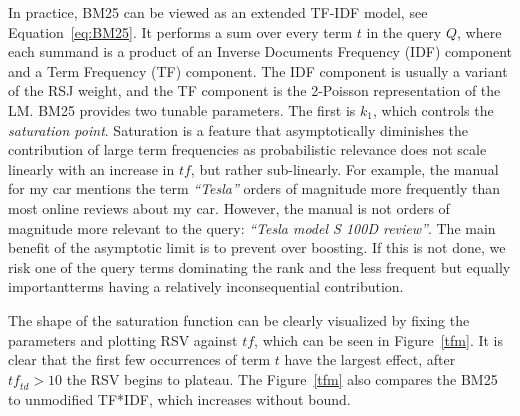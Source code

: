 In practice, BM25 can be viewed as an extended TF-IDF model, see Equation~\ref{eq:BM25}. It performs a sum over every term $t$ in the query $Q$, where each summand is a product of an Inverse Documents Frequency (IDF) component and a Term Frequency (TF) component. 
The IDF component is usually a variant of the RSJ weight, and the TF component is the 2-Poisson representation of the LM. BM25 provides two tunable parameters. The first is $k_1$, which controls the \textit{saturation point}. Saturation is a feature that asymptotically diminishes the contribution of large term frequencies as probabilistic relevance does not scale linearly with an increase in $\mathit{tf}$, but rather sub-linearly. For example, the manual for my car mentions the term \textit{``Tesla''} orders of magnitude more frequently than most online reviews about my car. However, the manual is not orders of magnitude more relevant to the query: \textit{``Tesla model S 100D review''}. The main benefit of the asymptotic limit is to prevent over boosting. If this is not done, we risk one of the query terms dominating the rank and the less frequent \textemdash but equally important\textemdash terms having a relatively inconsequential contribution. 

The shape of the saturation function can be clearly visualized by fixing the parameters and plotting RSV against $\mathit{tf}$, which can be seen in Figure~\ref{tfm}. It is clear that the first few occurrences of term $t$ have the largest effect, after $\mathit{tf}_{\!\!td} > 10$ the RSV begins to plateau. The Figure~\ref{tfm} also compares the BM25 to unmodified TF*IDF, which increases without bound.


